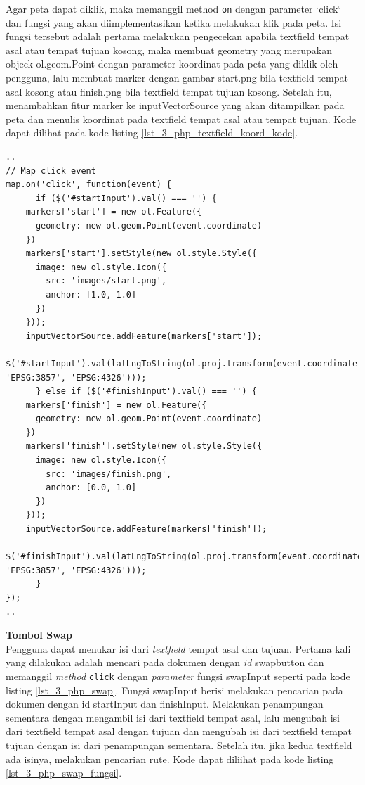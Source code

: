 \documentclass[a4paper,twoside]{article}
\begin{document}
\begin{enumerate}
\begin{enumerate}
  Agar peta dapat diklik, maka memanggil method \verb!on! dengan parameter `click` dan fungsi yang akan diimplementasikan ketika melakukan klik pada peta. Isi fungsi tersebut adalah pertama melakukan pengecekan apabila textfield tempat asal atau tempat tujuan kosong, maka membuat geometry yang merupakan objeck ol.geom.Point dengan parameter koordinat pada peta yang diklik oleh pengguna, lalu membuat marker dengan gambar start.png bila textfield tempat asal kosong atau finish.png bila textfield tempat tujuan kosong. Setelah itu, menambahkan fitur marker ke inputVectorSource yang akan ditampilkan pada peta dan menulis koordinat pada textfield tempat asal atau tempat tujuan. Kode dapat dilihat pada kode listing \ref{lst_3_php_textfield_koord_kode}.
  
  \begin{lstlisting}[caption=Membuat \textit{event} klik pada peta,label = {lst_3_php_textfield_koord_kode}]
..
// Map click event
map.on('click', function(event) {
      if ($('#startInput').val() === '') {
    markers['start'] = new ol.Feature({
      geometry: new ol.geom.Point(event.coordinate)
    })
    markers['start'].setStyle(new ol.style.Style({
      image: new ol.style.Icon({
        src: 'images/start.png',
        anchor: [1.0, 1.0]
      })
    }));
    inputVectorSource.addFeature(markers['start']);
        $('#startInput').val(latLngToString(ol.proj.transform(event.coordinate, 'EPSG:3857', 'EPSG:4326')));
      } else if ($('#finishInput').val() === '') {
    markers['finish'] = new ol.Feature({
      geometry: new ol.geom.Point(event.coordinate)
    })
    markers['finish'].setStyle(new ol.style.Style({
      image: new ol.style.Icon({
        src: 'images/finish.png',
        anchor: [0.0, 1.0]
      })
    }));
    inputVectorSource.addFeature(markers['finish']);
        $('#finishInput').val(latLngToString(ol.proj.transform(event.coordinate, 'EPSG:3857', 'EPSG:4326')));
      }
});
..
\end{lstlisting}

\end{enumerate}

\textbf{Tombol Swap}\\
Pengguna dapat menukar isi dari \textit{textfield} tempat asal dan tujuan. Pertama kali yang dilakukan adalah mencari pada dokumen dengan \textit{id} swapbutton dan memanggil \textit{method} \verb!click! dengan \textit{parameter} fungsi swapInput seperti pada kode listing \ref{lst_3_php_swap}. Fungsi swapInput berisi melakukan pencarian pada dokumen dengan id startInput dan finishInput. Melakukan penampungan sementara dengan mengambil isi dari textfield tempat asal, lalu mengubah isi dari textfield tempat asal dengan tujuan dan mengubah isi dari textfield tempat tujuan dengan isi dari penampungan sementara. Setelah itu, jika kedua textfield ada isinya, melakukan pencarian rute. Kode dapat diliihat pada kode listing \ref{lst_3_php_swap_fungsi}.


\end{enumerate}
\end{document}
